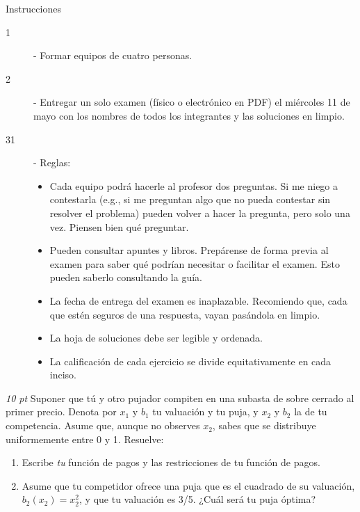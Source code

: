 \documentclass[12pt]{scrartcl} %
\begin{document}
\begin{summarybox}{Instrucciones}
\begin{description}
    \item[1] - Formar equipos de cuatro personas.
    \item[2] - Entregar un solo examen (físico o electrónico en PDF) el miércoles 11 de mayo con los nombres de todos los integrantes y las soluciones en limpio.
    \item[31] - Reglas:
      \begin{itemize}
        \setlength{\itemsep}{0pt}
        \setlength{\parskip}{0pt}
        \setlength{\parsep}{0pt}
        \item Cada equipo podrá hacerle al profesor dos preguntas. Si me niego a contestarla (e.g., si me preguntan algo que no pueda contestar sin resolver el problema) pueden volver a hacer la pregunta, pero solo una vez. Piensen bien qué preguntar.
        \item Pueden consultar apuntes y libros. Prepárense de forma previa al examen para saber qué podrían necesitar o facilitar el examen. Esto pueden saberlo consultando la guía.
        \item La fecha de entrega del examen es inaplazable. Recomiendo que, cada que estén seguros de una respuesta, vayan pasándola en limpio.
        \item La hoja de soluciones debe ser legible y ordenada.
        \item La calificación de cada ejercicio se divide equitativamente en cada inciso.
      \end{itemize}

  \end{description}

\end{summarybox}

\begin{center}
  \Coffeecup[1.5]
\end{center}

\newpage

\begin{Exercise}[title={Subasta de sobre cerrado a la primera puja, dos pujadores},name={Pregunta}]
  \textit{10 pt}
  Suponer que tú y otro pujador compiten en una subasta de sobre cerrado al primer precio. Denota por $x_1$ y $b_1$ tu valuación y tu puja, y $x_2$ y $b_2$ la de tu competencia. Asume que, aunque no observes $x_2$, sabes que se distribuye uniformemente entre 0 y 1. Resuelve:

  \begin{enumerate}
    \item Escribe \textit{tu} función de pagos y las restricciones de tu función de pagos.
    \item Asume que tu competidor ofrece una puja que es el cuadrado de su valuación, $b_2(x_2)=x_2^2$, y que tu valuación es 3/5. ¿Cuál será tu puja óptima?
  \end{enumerate}


\end{Exercise}
\end{document}
